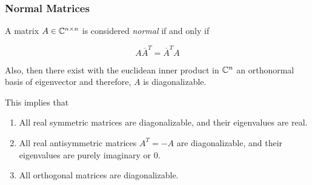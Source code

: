 \subsubsection{Normal Matrices}

A matrix \(A \in \mathbb{C}^{n \times n}\) is considered \emph{normal} if and only if 

\[
    A \overline{A}^{T} = \overline{A}^T A
\]  

Also, then there exist with the euclidean inner product in \(\mathbb{C}^n\) an orthonormal basis 
of eigenvector and therefore, \(A\) is diagonalizable.
\vspace{\baselineskip}

This implies that

\begin{enumerate}
    
    \item All real symmetric matrices are diagonalizable, and their eigenvalues are real.
    
    \item All real antisymmetric matrices \(A^T = -A\) are diagonalizable, and their eigenvalues are 
          purely imaginary or 0. 

    \item All orthogonal matrices are diagonalizable.

\end{enumerate}


